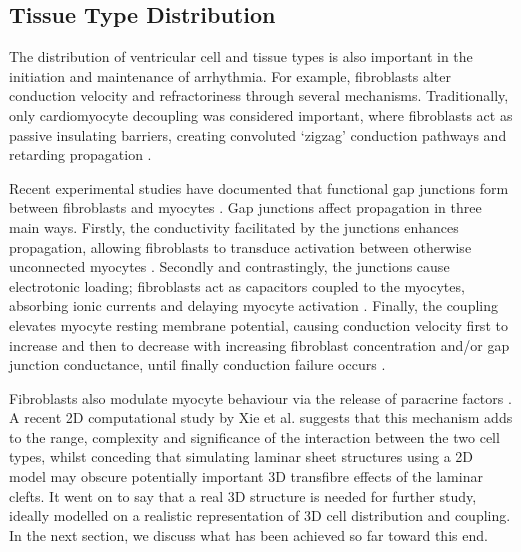 
  \subsection{Tissue Type Distribution} %
  \label{sub:tissue_type_distribution}
    The distribution of ventricular cell and tissue types is also important in the initiation and maintenance of arrhythmia. For example, fibroblasts alter conduction velocity and refractoriness through several mechanisms. Traditionally, only cardiomyocyte decoupling was considered important, where fibroblasts act as passive insulating barriers, creating convoluted ‘zigzag’ conduction pathways and retarding propagation \cite{deBakker:2006p685, Spach:2007p686}.
  
    Recent experimental studies have documented that functional gap junctions form between fibroblasts and myocytes \cite{Camelliti:2004p758, Camelliti:2005p747, Walker:2007p759}. Gap junctions affect propagation in three main ways.  Firstly, the conductivity facilitated by the junctions enhances propagation, allowing fibroblasts to transduce activation between otherwise unconnected myocytes \cite{Gaudesius:2003p767, Zlochiver:2008p842}. Secondly and contrastingly, the junctions cause electrotonic loading; fibroblasts act as capacitors coupled to the myocytes, absorbing ionic currents and delaying myocyte activation \cite{Jacquemet:2007p844, Xie:2009p678}. Finally, the coupling elevates myocyte resting membrane potential, causing conduction velocity first to increase and then to decrease with increasing fibroblast concentration and/or gap junction conductance, until finally conduction failure occurs \cite{Miragoli:2006p845, Xie:2009p678}.
  
    Fibroblasts also modulate myocyte behaviour via the release of paracrine factors \cite{Pedrotty:2009p688}. A recent 2D computational study by Xie et al. \cite{Xie:2009p678} suggests that this mechanism adds to the range, complexity and significance of the interaction between the two cell types, whilst conceding that simulating laminar sheet structures using a 2D model may obscure potentially important 3D transfibre effects of the laminar clefts. It went on to say that a real 3D structure is needed for further study, ideally modelled on a realistic representation of 3D cell distribution and coupling. In the next section, we discuss what has been achieved so far toward this end.

